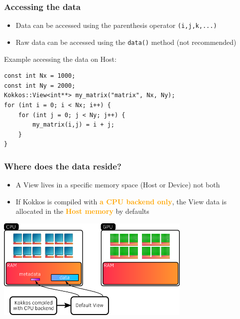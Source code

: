 \documentclass[aspectratio=169]{beamer}
\newcommand{\highlight}[1]{\textcolor{orange}{\textbf{#1}}}
\begin{document}

\begin{frame}[fragile]
    \frametitle{Accessing the data}

\begin{itemize}
    \item Data can be accessed using the parenthesis operator \texttt{(i,j,k,...)}
    \item Raw data can be accessed using the \texttt{data()} method (not recommended)
\end{itemize}

Example accessing the data on Host:

\small
\begin{verbatim}
const int Nx = 1000;
const int Ny = 2000;
Kokkos::View<int**> my_matrix("matrix", Nx, Ny);
for (int i = 0; i < Nx; i++) {
    for (int j = 0; j < Ny; j++) {
        my_matrix(i,j) = i + j;
    }
}
\end{verbatim}

\end{frame} 


\begin{frame}[fragile]
    \frametitle{Where does the data reside?}

    \begin{itemize}
        \item A View lives in a specific memory space (Host or Device) not both
        \item If Kokkos is compiled with \highlight{a CPU backend only}, the View data is allocated in the \highlight{Host memory} by defaults
    \end{itemize}

    \centering
    \includegraphics[width=0.7\textwidth]{../../images/host_view_memory.png}

\end{frame} 
\end{document}
